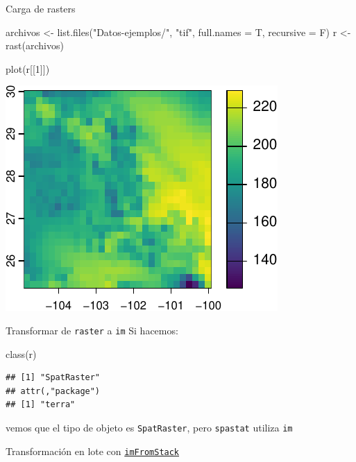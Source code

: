 \documentclass[
  11pt,
  ignorenonframetext,
]{beamer}
\newenvironment{Shaded}{}{}
\newcommand{\AttributeTok}[1]{\textcolor[rgb]{0.49,0.56,0.16}{#1}}
\newcommand{\DecValTok}[1]{\textcolor[rgb]{0.25,0.63,0.44}{#1}}
\newcommand{\FunctionTok}[1]{\textcolor[rgb]{0.02,0.16,0.49}{#1}}
\newcommand{\NormalTok}[1]{#1}
\newcommand{\OtherTok}[1]{\textcolor[rgb]{0.00,0.44,0.13}{#1}}
\newcommand{\StringTok}[1]{\textcolor[rgb]{0.25,0.44,0.63}{#1}}
\begin{document}
\begin{frame}[fragile]{Carga de rasters}
\protect\hypertarget{carga-de-rasters}{}
\begin{Shaded}
\begin{Highlighting}[]
\NormalTok{archivos }\OtherTok{\textless{}{-}} \FunctionTok{list.files}\NormalTok{(}\StringTok{"Datos{-}ejemplos/"}\NormalTok{, }\StringTok{"tif"}\NormalTok{, }
                       \AttributeTok{full.names =}\NormalTok{ T, }
                       \AttributeTok{recursive =}\NormalTok{ F)}
\NormalTok{r }\OtherTok{\textless{}{-}} \FunctionTok{rast}\NormalTok{(archivos)}
\end{Highlighting}
\end{Shaded}

\begin{Shaded}
\begin{Highlighting}[]
\FunctionTok{plot}\NormalTok{(r[[}\DecValTok{1}\NormalTok{]])}
\end{Highlighting}
\end{Shaded}

\begin{center}\includegraphics{Tutorial-spatstat_files/figure-beamer/unnamed-chunk-6-1} \end{center}
\end{frame}

\begin{frame}[fragile]{Transformar de \texttt{raster} a \texttt{im}}
\protect\hypertarget{transformar-de-raster-a-im}{}
Si hacemos:

\begin{Shaded}
\begin{Highlighting}[]
\FunctionTok{class}\NormalTok{(r)}
\end{Highlighting}
\end{Shaded}

\begin{verbatim}
## [1] "SpatRaster"
## attr(,"package")
## [1] "terra"
\end{verbatim}

vemos que el tipo de objeto es \texttt{SpatRaster}, pero
\texttt{spastat} utiliza \texttt{im}

Transformación en lote con
\href{Funciones-spatstat/imFromStack.R}{\texttt{imFromStack}}
\end{frame}
\end{document}
